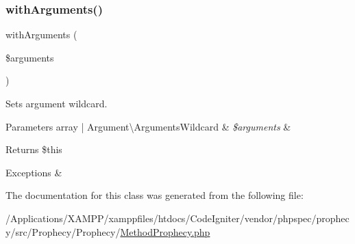 \subsubsection{\texorpdfstring{with\+Arguments()}{withArguments()}}
{\footnotesize\ttfamily with\+Arguments (\begin{DoxyParamCaption}\item[{}]{\$arguments }\end{DoxyParamCaption})}

Sets argument wildcard.


\begin{DoxyParams}[1]{Parameters}
array | Argument\textbackslash{}\+Arguments\+Wildcard & {\em \$arguments} & \\
\hline
\end{DoxyParams}
\begin{DoxyReturn}{Returns}
\$this
\end{DoxyReturn}

\begin{DoxyExceptions}{Exceptions}
{\em } & \\
\hline
\end{DoxyExceptions}


The documentation for this class was generated from the following file\+:\begin{DoxyCompactItemize}
\item 
/\+Applications/\+X\+A\+M\+P\+P/xamppfiles/htdocs/\+Code\+Igniter/vendor/phpspec/prophecy/src/\+Prophecy/\+Prophecy/\mbox{\hyperlink{_method_prophecy_8php}{Method\+Prophecy.\+php}}\end{DoxyCompactItemize}
